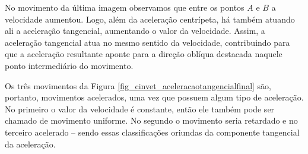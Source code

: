 No movimento da última imagem observamos que entre os pontos $A$ e $B$ a velocidade aumentou. Logo, além da aceleração centrípeta, há também atuando ali a aceleração tangencial, aumentando o valor da velocidade. Assim, a aceleração tangencial atua no mesmo sentido da velocidade, contribuindo para que a aceleração resultante aponte para a direção oblíqua destacada naquele ponto intermediário do movimento.




Os três movimentos da Figura \ref{fig_cinvet_aceleracaotangencialfinal} são, portanto, movimentos acelerados, uma vez que possuem algum tipo de aceleração. No primeiro o valor da velocidade é constante, então ele também pode ser chamado de movimento uniforme. No segundo o movimento seria retardado e no terceiro acelerado -- sendo essas classificações oriundas da componente tangencial da aceleração.

\vspace{0.3cm}

